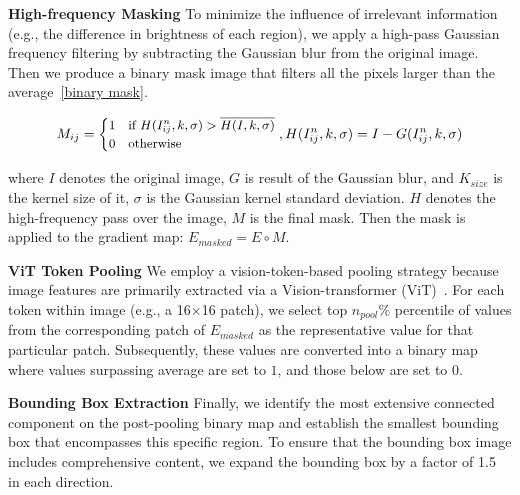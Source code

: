 \textbf{High-frequency Masking}
To minimize the influence of irrelevant information (e.g., the difference in brightness of each region), we apply a high-pass Gaussian frequency filtering by subtracting the Gaussian blur from the original image. Then we produce a binary mask image that filters all the pixels larger than the average~\autoref{binary mask}. 

\begin{equation}
\small
\label{binary mask}
M_{ij} = \begin{cases} 
1 & \text{if } H(I^n_{ij}, k, \sigma) > \overline{H(I, k, \sigma)} \\
0 & \text{otherwise}
\end{cases}, H(I^n_{ij}, k, \sigma) = I - G(I^n_{ij}, k, \sigma)
\end{equation}


where $I$ denotes the original image, $G$ is result of the Gaussian blur,
and $K_{size}$ is the kernel size of it, $\sigma$ is the Gaussian kernel standard deviation. 
$H$ denotes the high-frequency pass over the image, $M$ is the final mask. Then the mask is applied to the gradient map: $E_{masked} = E \circ M$. 


\textbf{ViT Token Pooling}
We employ a vision-token-based pooling strategy because image features are primarily extracted via a Vision-transformer (ViT)~\citep{vit}. For each token within image (e.g., a 16$\times$16 patch), we select top $n_{pool}\%$ percentile of values from the corresponding patch of $E_{masked}$ as the representative value for that particular patch. Subsequently, these values are converted into a binary map where values surpassing average are set to $1$, and those below are set to $0$.

\textbf{Bounding Box Extraction}
Finally, we identify the most extensive connected component on the post-pooling binary map and establish the smallest bounding box that encompasses this specific region. To ensure that the bounding box image includes comprehensive content, we expand the bounding box by a factor of 1.5 in each direction.

